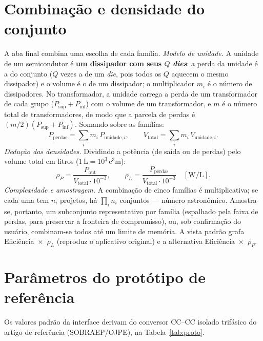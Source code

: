 \documentclass[
	a4paper, 12pt,
	chapter=TITLE, section=Title, subsection=Title,
	oneside, english, brazil, fleqn
]{abntex2}
\begin{document}
\chapter{Combinação e densidade do conjunto}
\label{cap:comb}
A aba final combina uma escolha de cada família. \textit{Modelo de unidade.} A
unidade de um semicondutor é \textbf{um dissipador com seus $Q$ \emph{dies}}: a
perda da unidade é a do conjunto ($Q$ vezes a de um \emph{die}, pois todos os
$Q$ aquecem o mesmo dissipador) e o volume é o de um dissipador; o multiplicador
$m_i$ é o número de dissipadores. No transformador, a unidade carrega a perda de
um transformador de cada grupo ($P_{\mathrm{sup}}+P_{\mathrm{inf}}$) com o volume de
um transformador, e $m$ é o número total de transformadores, de modo que a parcela
de perdas é $(m/2)(P_{\mathrm{sup}}+P_{\mathrm{inf}})$. Somando sobre as famílias:
\begin{equation}
	P_{\mathrm{perdas}}=\sum_i m_i\,P_{\mathrm{unidade},i},\qquad
	V_{\mathrm{total}}=\sum_i m_i\,V_{\mathrm{unidade},i}.
	\label{eq:combina}
\end{equation}
\textit{Dedução das densidades.} Dividindo a potência (de saída ou de perdas)
pelo volume total em litros ($1\,\si{\liter}=10^{3}\,\si{\cubic\centi\meter}$):
\begin{equation}
	\rho_{P}=\frac{P_{\mathrm{out}}}{V_{\mathrm{total}}\cdot10^{-3}},\qquad
	\rho_{L}=\frac{P_{\mathrm{perdas}}}{V_{\mathrm{total}}\cdot10^{-3}}\quad[\si{\watt\per\liter}].
	\label{eq:densi}
\end{equation}
\textit{Complexidade e amostragem.} A combinação de cinco famílias é
multiplicativa; se cada uma tem $n_i$ projetos, há $\prod_i n_i$ conjuntos ---
número astronômico. Amostra-se, portanto, um subconjunto representativo por
família (espalhado pela faixa de perdas, para preservar a fronteira de
compromisso), ou, sob confirmação do usuário, combinam-se todos até um limite de
memória. A vista padrão grafa Eficiência~$\times$~$\rho_L$ (reproduz o aplicativo
original) e a alternativa Eficiência~$\times$~$\rho_P$.

\chapter{Parâmetros do protótipo de referência}
Os valores padrão da interface derivam do conversor CC--CC isolado trifásico do
artigo de referência (SOBRAEP/OJPE), na Tabela~\ref{tab:proto}.
\end{document}
